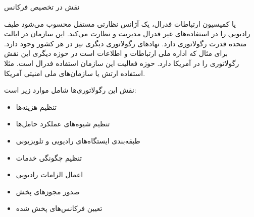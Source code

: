 \Problem
{نقش  در تخصیص فرکانس}
{
یا کمیسیون ارتباطات فدرال،
یک آژانس نظارتی مستقل محسوب می‌شود طیف رادیویی را در استفاده‌های غیر فدرال
مدیریت و نظارت می‌کند. این سازمان در ایالت متحده قدرت رگولاتوری دارد.
نهادهای رگولاتوری دیگری نیز در هر کشور وجود دارد. برای مثال
که اداره ملی ارتباطات و اطلاعات است در حوزه دیگری این نقش رگولاتوری را در آمریکا دارد.
حوزه فعالیت این سازمان استفاده فدرال است. مثلا استفاده ارتش یا سازمان‌های ملی امنیتی آمریکا.

نقش این رگولاتوری‌ها شامل موارد زیر است:
\begin{itemize}
    \item
    تنظیم هزینه‌ها
    
    \item
    تنظیم شیوه‌های عملکرد حامل‌ها
    
    \item
    طبقه‌بندی ایستگاه‌های رادیویی و تلویزیونی
    
    \item
    تنظیم چگونگی خدمات
    
    \item
    اعمال الزامات رادیویی
    
    \item
    صدور مجوزهای پخش
    
    \item
    تعیین فرکانس‌های پخش شده
\end{itemize}
}
